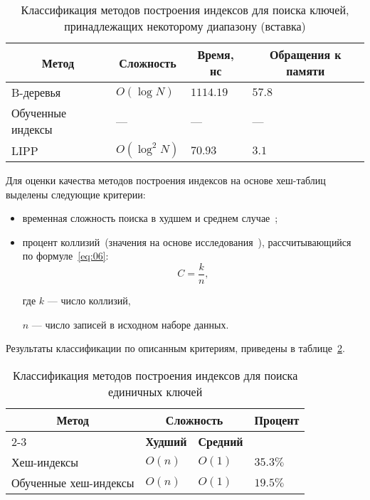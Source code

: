 {
\captionsetup{format=hang,justification=raggedright,
              singlelinecheck=off,width=16.8cm}
\begin{longtable}[Hc]{|p{5cm}|p{2cm}|p{2cm}|p{2cm}|}
\caption{Классификация методов построения индексов для поиска ключей,
принадлежащих некоторому диапазону (вставка)\label{tab:02}}\\
    \hline
    \multicolumn{1}{|c}{\textbf{Метод}} &
    \multicolumn{1}{|c|}{\textbf{Сложность}} &
    \multicolumn{1}{|c|}{\textbf{Время, нс}} &
    \multicolumn{1}{c|}{\parbox{3cm}{\vspace{2mm}\centering\textbf{Обращения к
    памяти}}}\\[2.5ex]
    \hline
    B-деревья
    & $O(\log N)$
    & $1114.19$
    & $57.8$\\
    \hline
    Обученные индексы
    & ---
    & ---
    & ---\\
    \hline
    LIPP 
    & $O(\log^2 N)$
    & $70.93$
    & $3.1$\\
    \hline
\end{longtable}
}

Для оценки качества методов построения индексов на основе хеш-таблиц выделены
следующие критерии:
\begin{itemize}
    \item временная сложность поиска в худшем и среднем случае~\cite{main,
        squares};
    \item процент коллизий~(значения на основе исследования~\cite{main}),
        рассчитывающийся по формуле~\eqref{eq:06}:
        \begin{equation}\label{eq:06}
            C = \frac{k}{n},
        \end{equation}
        
      где $k$ --- число коллизий,
      
      $n$ --- число записей в исходном наборе данных.
\end{itemize}

Результаты классификации по описанным критериям, приведены в таблице~\ref{tab:03}.

{
\captionsetup{format=hang,justification=raggedleft,
              singlelinecheck=off,width=13.3cm}
\begin{longtable}[Hc]{|p{5.3cm}|p{2cm}|p{2cm}|p{2cm}|}
\caption{Классификация методов построения индексов для поиска единичных
ключей\label{tab:03}}\\
    \hline
    \multicolumn{1}{|c|}{\multirow{2}{*}{\textbf{Метод}}} &
    \multicolumn{2}{c|}{\textbf{Сложность}} &
    \multicolumn{1}{c|}{\multirow{2}{*}{\parbox{2cm}{\textbf{Процент}}}}\\
    \cline{2-3}
    & \multicolumn{1}{c|}{\textbf{Худший}}
    & \multicolumn{1}{c|}{\textbf{Средний}}
    &\\
    \hline
    Хеш-индексы
    & $O(n)$
    & $O(1)$
    & $35.3\%$\\
    \hline
    Обученные хеш-индексы
    & $O(n)$
    & $O(1)$
    & $19.5\%$\\
    \hline
\end{longtable}
}

